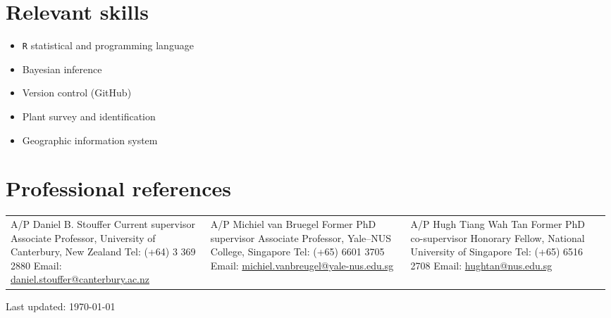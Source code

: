 \documentclass[a4paper]{article}
\def\footerlink{}
\begin{document}
\section*{Relevant skills}
\begin{multicols}{2}
\begin{itemize}
	\item \texttt{R} statistical and programming language
	\item Bayesian inference
	\item Version control (GitHub)
\end{itemize}
\columnbreak
\begin{itemize}
	\item Plant survey and identification
	\item Geographic information system
\end{itemize}
\end{multicols}


\section*{Professional references}
\begin{tabular}{p{0.33\linewidth} p{0.33\linewidth} p{0.33\linewidth}}
A/P Daniel B. Stouffer \newline Current supervisor \newline Associate Professor, University of Canterbury, New Zealand \newline Tel: (+64) 3 369 2880 \newline Email: \url{daniel.stouffer@canterbury.ac.nz} &
A/P Michiel van Bruegel \newline Former PhD supervisor \newline Associate Professor, Yale--NUS College, Singapore \newline Tel: (+65) 6601 3705 \newline Email: \url{michiel.vanbreugel@yale-nus.edu.sg} &
A/P Hugh Tiang Wah Tan \newline Former PhD co-supervisor \newline Honorary Fellow, National University of Singapore \newline Tel: (+65) 6516 2708 \newline Email: \url{hughtan@nus.edu.sg} 
\end{tabular}

\vfill

\begin{center}
  \begin{footnotesize}
    Last updated: \today \\
    \href{\footerlink}{\texttt{\footerlink}}
  \end{footnotesize}
\end{center}
\end{document}
